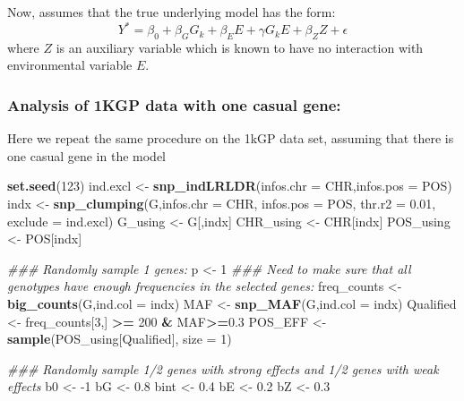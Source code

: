 \documentclass[
]{article}
\newenvironment{Shaded}{\begin{snugshade}}{\end{snugshade}}
\newcommand{\CommentTok}[1]{\textcolor[rgb]{0.56,0.35,0.01}{\textit{#1}}}
\newcommand{\DataTypeTok}[1]{\textcolor[rgb]{0.13,0.29,0.53}{#1}}
\newcommand{\DecValTok}[1]{\textcolor[rgb]{0.00,0.00,0.81}{#1}}
\newcommand{\FloatTok}[1]{\textcolor[rgb]{0.00,0.00,0.81}{#1}}
\newcommand{\KeywordTok}[1]{\textcolor[rgb]{0.13,0.29,0.53}{\textbf{#1}}}
\newcommand{\NormalTok}[1]{#1}
\newcommand{\OperatorTok}[1]{\textcolor[rgb]{0.81,0.36,0.00}{\textbf{#1}}}
\newcommand{\StringTok}[1]{\textcolor[rgb]{0.31,0.60,0.02}{#1}}
\begin{document}
Now, assumes that the true underlying model has the form:
\[Y^* = \beta_0 + \beta_GG_k + \beta_EE+\gamma G_kE +\beta_ZZ + \epsilon\]
where \(Z\) is an auxiliary variable which is known to have no
interaction with environmental variable \(E\).

\hypertarget{analysis-of-1kgp-data-with-one-casual-gene}{%
\subsubsection{Analysis of 1KGP data with one casual
gene:}\label{analysis-of-1kgp-data-with-one-casual-gene}}

Here we repeat the same procedure on the 1kGP data set, assuming that
there is one casual gene in the model

\begin{Shaded}
\begin{Highlighting}[]
\KeywordTok{set.seed}\NormalTok{(}\DecValTok{123}\NormalTok{)}
\NormalTok{ind.excl <-}\StringTok{ }\KeywordTok{snp_indLRLDR}\NormalTok{(}\DataTypeTok{infos.chr =}\NormalTok{ CHR,}\DataTypeTok{infos.pos =}\NormalTok{ POS)}
\NormalTok{indx <-}\StringTok{ }\KeywordTok{snp_clumping}\NormalTok{(G,}\DataTypeTok{infos.chr =}\NormalTok{ CHR, }\DataTypeTok{infos.pos =}\NormalTok{ POS, }\DataTypeTok{thr.r2 =} \FloatTok{0.01}\NormalTok{, }\DataTypeTok{exclude =}\NormalTok{ ind.excl)}
\NormalTok{G_using <-}\StringTok{ }\NormalTok{G[,indx]}
\NormalTok{CHR_using <-}\StringTok{ }\NormalTok{CHR[indx]}
\NormalTok{POS_using <-}\StringTok{ }\NormalTok{POS[indx]}


\CommentTok{### Randomly sample 1 genes:}
\NormalTok{p <-}\StringTok{ }\DecValTok{1}
\CommentTok{### Need to make sure that all genotypes have enough frequencies in the selected genes:}
\NormalTok{freq_counts <-}\StringTok{ }\KeywordTok{big_counts}\NormalTok{(G,}\DataTypeTok{ind.col =}\NormalTok{ indx)}
\NormalTok{MAF <-}\StringTok{ }\KeywordTok{snp_MAF}\NormalTok{(G,}\DataTypeTok{ind.col =}\NormalTok{ indx)}
\NormalTok{Qualified <-}\StringTok{ }\NormalTok{freq_counts[}\DecValTok{3}\NormalTok{,] }\OperatorTok{>=}\StringTok{ }\DecValTok{200} \OperatorTok{&}\StringTok{ }\NormalTok{MAF}\OperatorTok{>=}\FloatTok{0.3}
\NormalTok{POS_EFF <-}\StringTok{ }\KeywordTok{sample}\NormalTok{(POS_using[Qualified], }\DataTypeTok{size =} \DecValTok{1}\NormalTok{)}


\CommentTok{### Randomly sample 1/2 genes with strong effects and 1/2 genes with weak effects}
\NormalTok{b0 <-}\StringTok{ }\DecValTok{-1}
\NormalTok{bG <-}\StringTok{ }\FloatTok{0.8}
\NormalTok{bint <-}\StringTok{ }\FloatTok{0.4}
\NormalTok{bE <-}\StringTok{ }\FloatTok{0.2}
\NormalTok{bZ <-}\StringTok{ }\FloatTok{0.3}


\end{Highlighting}
\end{Shaded}
\end{document}
